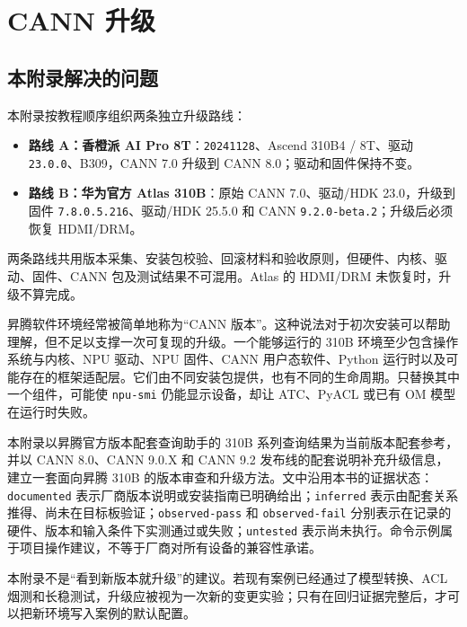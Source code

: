 \chapter{CANN 升级}\label{ux9644ux5f55-7cann-ux5347ux7ea7}

\section{本附录解决的问题}\label{ux672cux9644ux5f55ux89e3ux51b3ux7684ux95eeux9898}

本附录按教程顺序组织两条独立升级路线：

\begin{itemize}
\tightlist
\item
  \textbf{路线 A：香橙派 AI Pro
  8T}：\passthrough{\lstinline!20241128!}、Ascend 310B4 / 8T、驱动
  \passthrough{\lstinline!23.0.0!}、B309，CANN 7.0 升级到 CANN
  8.0；驱动和固件保持不变。
\item
  \textbf{路线 B：华为官方 Atlas 310B}：原始 CANN 7.0、驱动/HDK
  23.0，升级到固件 \passthrough{\lstinline!7.8.0.5.216!}、驱动/HDK
  25.5.0 和 CANN \passthrough{\lstinline!9.2.0-beta.2!}；升级后必须恢复
  HDMI/DRM。
\end{itemize}

两条路线共用版本采集、安装包校验、回滚材料和验收原则，但硬件、内核、驱动、固件、CANN
包及测试结果不可混用。Atlas 的 HDMI/DRM 未恢复时，升级不算完成。

昇腾软件环境经常被简单地称为``CANN
版本''。这种说法对于初次安装可以帮助理解，但不足以支撑一次可复现的升级。一个能够运行的
310B 环境至少包含操作系统与内核、NPU 驱动、NPU 固件、CANN
用户态软件、Python
运行时以及可能存在的框架适配层。它们由不同安装包提供，也有不同的生命周期。只替换其中一个组件，可能使
\passthrough{\lstinline!npu-smi!} 仍能显示设备，却让 ATC、PyACL 或已有
OM 模型在运行时失败。

本附录以昇腾官方版本配套查询助手的 310B
系列查询结果为当前版本配套参考，并以 CANN 8.0、CANN 9.0.X 和 CANN 9.2
发布线的配套说明补充升级信息，建立一套面向昇腾 310B
的版本审查和升级方法。文中沿用本书的证据状态：\passthrough{\lstinline!documented!}
表示厂商版本说明或安装指南已明确给出；\passthrough{\lstinline!inferred!}
表示由配套关系推得、尚未在目标板验证；\passthrough{\lstinline!observed-pass!}
和 \passthrough{\lstinline!observed-fail!}
分别表示在记录的硬件、版本和输入条件下实测通过或失败；\passthrough{\lstinline!untested!}
表示尚未执行。命令示例属于项目操作建议，不等于厂商对所有设备的兼容性承诺。

本附录不是``看到新版本就升级''的建议。若现有案例已经通过了模型转换、ACL
烟测和长稳测试，升级应被视为一次新的变更实验；只有在回归证据完整后，才可以把新环境写入案例的默认配置。

